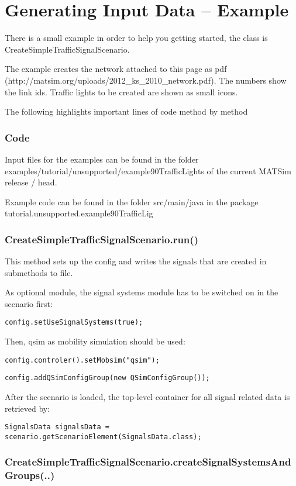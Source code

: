 \section{Generating Input Data -- Example}

There is a small example in order to help you getting started, the class is CreateSimpleTrafficSignalScenario.

The example creates the network attached to this page as pdf (http://matsim.org/uploads/2012\_ks\_2010\_network.pdf). The numbers show the link ids. Traffic lights to be created are shown as small icons.

The following highlights important lines of code method by method

\subsubsection{Code}

Input files for the examples can be found in the folder examples/tutorial/unsupported/example90TrafficLights of the current MATSim release / head.

Example code can be found in the folder src/main/java in the package tutorial.unsupported.example90TrafficLig

\subsubsection{CreateSimpleTrafficSignalScenario.run()}

This method sets up the config and writes the signals that are created in submethods to file.

As optional module, the signal systems module has to be switched on in the scenario first:


\texttt{\nolinebreak config.setUseSignalSystems(true);}

Then, qsim as mobility simulation should be used:


\texttt{\nolinebreak config.controler().setMobsim("qsim"); \nolinebreak }


\texttt{\nolinebreak config.addQSimConfigGroup(new QSimConfigGroup());}

After the scenario is loaded, the top-level container for all signal related data is retrieved by:


\texttt{\nolinebreak SignalsData signalsData = scenario.getScenarioElement(SignalsData.class);}

\subsubsection{CreateSimpleTrafficSignalScenario.createSignalSystemsAndGroups(..)}

